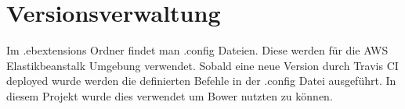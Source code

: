 \chapter{Versionsverwaltung}\label{ch:versionsverwaltung}
Im .ebextensions Ordner findet man .config Dateien. Diese werden für die AWS Elastikbeanstalk Umgebung verwendet. Sobald eine neue Version durch Travis CI deployed wurde werden die definierten Befehle in der .config Datei ausgeführt. In diesem Projekt wurde dies verwendet um Bower nutzten zu können.